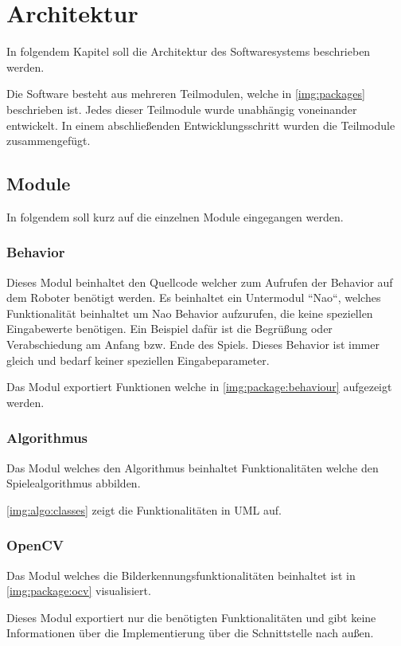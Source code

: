 \chapter{Architektur}

    In folgendem Kapitel soll die Architektur des Softwaresystems beschrieben
    werden.

    Die Software besteht aus mehreren Teilmodulen, welche in
    \autoref{img:packages} beschrieben ist.
    Jedes dieser Teilmodule wurde unabhängig voneinander entwickelt. In einem
    abschließenden Entwicklungsschritt wurden die Teilmodule zusammengefügt.

    \section{Module}

        In folgendem soll kurz auf die einzelnen Module eingegangen werden.

        \subsection{Behavior}

            Dieses Modul beinhaltet den Quellcode welcher zum Aufrufen der
            Behavior auf dem Roboter benötigt werden.
            Es beinhaltet ein Untermodul ``Nao``, welches Funktionalität
            beinhaltet um Nao Behavior aufzurufen, die keine speziellen
            Eingabewerte benötigen.
            Ein Beispiel dafür ist die Begrüßung oder Verabschiedung am Anfang
            bzw. Ende des Spiels.
            Dieses Behavior ist immer gleich und bedarf keiner speziellen
            Eingabeparameter.

            Das Modul exportiert Funktionen welche in
            \autoref{img:package:behaviour} aufgezeigt werden.

        \subsection{Algorithmus}

            Das Modul welches den Algorithmus beinhaltet Funktionalitäten welche
            den Spielealgorithmus abbilden.

            \autoref{img:algo:classes} zeigt die Funktionalitäten in UML auf.

        \subsection{OpenCV}

            Das Modul welches die Bilderkennungsfunktionalitäten beinhaltet ist
            in \autoref{img:package:ocv} visualisiert.

            Dieses Modul exportiert nur die benötigten Funktionalitäten und gibt
            keine Informationen über die Implementierung über die Schnittstelle
            nach außen.

